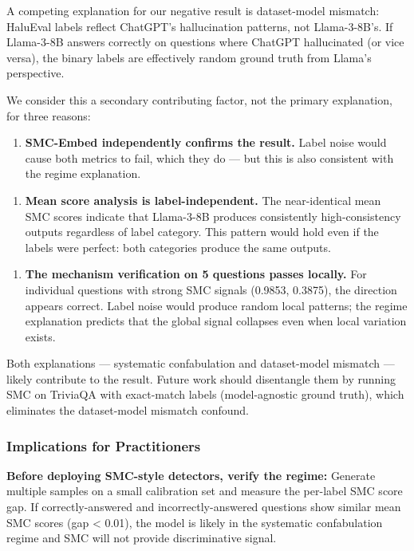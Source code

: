 A competing explanation for our negative result is dataset-model mismatch: HaluEval labels reflect ChatGPT's hallucination patterns, not Llama-3-8B's. If Llama-3-8B answers correctly on questions where ChatGPT hallucinated (or vice versa), the binary labels are effectively random ground truth from Llama's perspective.

We consider this a secondary contributing factor, not the primary explanation, for three reasons:

\begin{enumerate}
\item \textbf{SMC-Embed independently confirms the result.} Label noise would cause both metrics to fail, which they do --- but this is also consistent with the regime explanation.
\end{enumerate}

\begin{enumerate}
\item \textbf{Mean score analysis is label-independent.} The near-identical mean SMC scores indicate that Llama-3-8B produces consistently high-consistency outputs regardless of label category. This pattern would hold even if the labels were perfect: both categories produce the same outputs.
\end{enumerate}

\begin{enumerate}
\item \textbf{The mechanism verification on 5 questions passes locally.} For individual questions with strong SMC signals (0.9853, 0.3875), the direction appears correct. Label noise would produce random local patterns; the regime explanation predicts that the global signal collapses even when local variation exists.
\end{enumerate}

Both explanations --- systematic confabulation and dataset-model mismatch --- likely contribute to the result. Future work should disentangle them by running SMC on TriviaQA with exact-match labels (model-agnostic ground truth), which eliminates the dataset-model mismatch confound.

\subsubsection{Implications for Practitioners}

\textbf{Before deploying SMC-style detectors, verify the regime:} Generate multiple samples on a small calibration set and measure the per-label SMC score gap. If correctly-answered and incorrectly-answered questions show similar mean SMC scores (gap < 0.01), the model is likely in the systematic confabulation regime and SMC will not provide discriminative signal.

